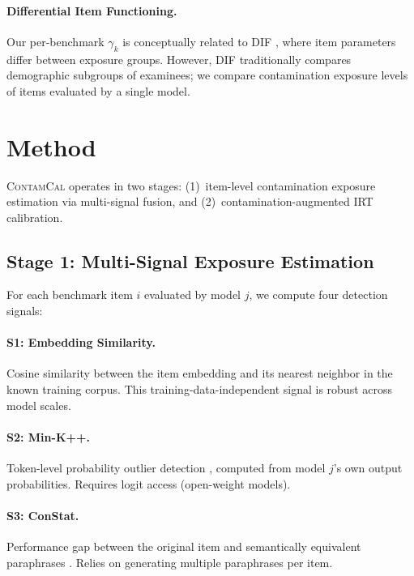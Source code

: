 \documentclass[11pt,a4paper]{article}
\newcommand{\contamcal}{\textsc{ContamCal}}
\begin{document}
\paragraph{Differential Item Functioning.}
Our per-benchmark $\gamma_k$ is conceptually related to DIF \citep{holland1993differential,thissen1993detection,zumbo1999handbook}, where item parameters differ between exposure groups.
However, DIF traditionally compares demographic subgroups of examinees; we compare contamination exposure levels of items evaluated by a single model.

\section{Method}
\label{sec:method}

\contamcal{} operates in two stages: (1)~item-level contamination exposure estimation via multi-signal fusion, and (2)~contamination-augmented IRT calibration.

\subsection{Stage 1: Multi-Signal Exposure Estimation}
\label{sec:stage1}

For each benchmark item $i$ evaluated by model $j$, we compute four detection signals:

\paragraph{S1: Embedding Similarity.}
Cosine similarity between the item embedding and its nearest neighbor in the known training corpus.
This training-data-independent signal is robust across model scales.

\paragraph{S2: Min-K++.}
Token-level probability outlier detection \citep{shi2024detecting}, computed from model $j$'s own output probabilities.
Requires logit access (open-weight models).

\paragraph{S3: ConStat.}
Performance gap between the original item and semantically equivalent paraphrases \citep{dekoninck2024constat}.
Relies on generating multiple paraphrases per item.
\end{document}
